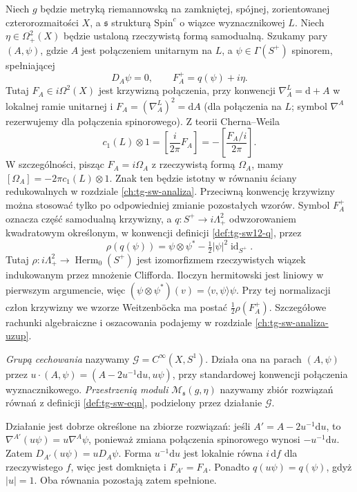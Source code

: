 \begin{definicja}
\label{def:tg-sw-eqn}
Niech $g$ będzie metryką riemannowską na zamkniętej,
spójnej, zorientowanej czterorozmaitości $X$, a
$\mathfrak s$ strukturą $\mathrm{Spin}^c$ o wiązce
wyznacznikowej $L$. Niech $\eta\in\Omega^2_+(X)$
będzie ustaloną rzeczywistą formą samodualną.
Szukamy pary $(A,\psi)$, gdzie $A$ jest połączeniem
unitarnym na $L$, a $\psi\in\Gamma(S^+)$ spinorem,
spełniającej
\[
D_A\psi=0,\qquad F_A^+=q(\psi)+i\eta.
\]
Tutaj $F_A\in i\Omega^2(X)$ jest krzywizną połączenia,
przy konwencji $\nabla^L_A=\mathrm d+A$ w lokalnej
ramie unitarnej i $F_A=(\nabla^L_A)^2=\mathrm dA$
(dla połączenia na $L$; symbol $\nabla^A$
rezerwujemy dla połączenia spinorowego). Z teorii Cherna--Weila
\[
c_1(L)\otimes1=\left[\frac{i}{2\pi}F_A\right]
=-\left[\frac{F_A/i}{2\pi}\right].
\]
W szczególności, pisząc $F_A=i\Omega_A$ z rzeczywistą
formą $\Omega_A$, mamy $[\Omega_A]=-2\pi c_1(L)\otimes1$.
Znak ten będzie istotny w równaniu ściany redukowalnych
w rozdziale \ref{ch:tg-sw-analiza}. Przeciwną
konwencję krzywizny można stosować tylko po
odpowiedniej zmianie pozostałych wzorów.
Symbol $F_A^+$ oznacza część samodualną krzywizny, a
$q:S^+\to i\Lambda^2_+$ odwzorowaniem kwadratowym
określonym, w konwencji definicji
\ref{def:tg-sw12-q}, przez
\[
\rho(q(\psi))=\psi\otimes\psi^*
-\tfrac12|\psi|^2\operatorname{id}_{S^+}.
\]
Tutaj $\rho:i\Lambda^2_+\to\operatorname{Herm}_0(S^+)$
jest izomorfizmem rzeczywistych wiązek indukowanym
przez mnożenie Clifforda. Iloczyn hermitowski
jest liniowy w pierwszym argumencie, więc
$(\psi\otimes\psi^*)(v)=\langle v,\psi\rangle\psi$.
Przy tej normalizacji człon krzywizny we wzorze
Weitzenböcka ma postać $\frac12\rho(F_A^+)$.
Szczegółowe rachunki algebraiczne i oszacowania
podajemy w rozdziale \ref{ch:tg-sw-analiza-uzup}.
\end{definicja}

\begin{definicja}
\emph{Grupą cechowania} nazywamy
$\mathcal G=C^\infty(X,S^1)$.
Działa ona na parach $(A,\psi)$ przez
$u\cdot(A,\psi)=(A-2u^{-1}\mathrm du,u\psi)$,
przy standardowej konwencji połączenia wyznacznikowego.
\emph{Przestrzenią moduli} $\mathcal M_{\mathfrak s}(g,\eta)$
nazywamy zbiór rozwiązań równań z definicji
\ref{def:tg-sw-eqn}, podzielony przez działanie $\mathcal G$.
\end{definicja}

Działanie jest dobrze określone na zbiorze rozwiązań:
jeśli $A'=A-2u^{-1}\mathrm du$, to
$\nabla^{A'}(u\psi)=u\nabla^A\psi$,
ponieważ zmiana połączenia spinorowego wynosi
$-u^{-1}\mathrm du$. Zatem $D_{A'}(u\psi)=uD_A\psi$.
Forma $u^{-1}\mathrm du$ jest lokalnie równa
$i\,\mathrm df$ dla rzeczywistego $f$,
więc jest domknięta i $F_{A'}=F_A$.
Ponadto $q(u\psi)=q(\psi)$, gdyż $|u|=1$.
Oba równania pozostają zatem spełnione.

